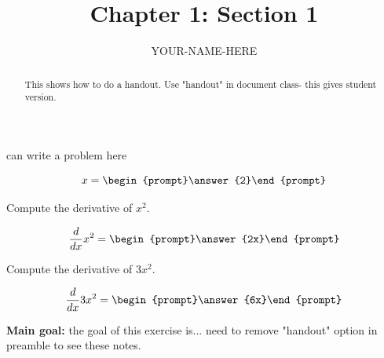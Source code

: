 \documentclass[noauthor,handout]{ximera}
\author{YOUR-NAME-HERE}
\begin{document}
\title{Chapter 1: Section 1}
\begin{abstract}
    This shows how to do a handout. Use "handout" in document class- this gives student version.
\end{abstract}
\maketitle

\begin{problem}
can write a problem here

\[
x=\begin{prompt}\answer{2}\end{prompt}
\]

\end{problem}


\begin{exercise}
Compute the derivative of $x^2$.

\[
\frac{d}{dx} x^2 = \begin{prompt}\answer{2x}\end{prompt}  
\]
  
\end{exercise}



\begin{exercise}
Compute the derivative of $3x^2$.

\[
\frac{d}{dx} 3x^2 = \begin{prompt}\answer{6x}\end{prompt}  
\]
  
\end{exercise}

\begin{instructorNotes}
   {\bf Main goal:} the goal of this exercise is... 
   need to remove "handout" option in preamble to see these notes.
\end{instructorNotes}
\end{document}
